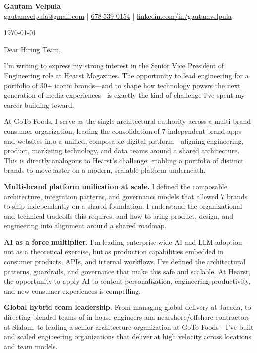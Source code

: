 \documentclass[11pt]{article}
\begin{document}
\begin{center}
    {\LARGE \textbf{Gautam Velpula}} \\[6pt]
    \href{mailto:gautamvelpula@gmail.com}{gautamvelpula@gmail.com} \;|\;
    \href{tel:6785390154}{678-539-0154} \;|\;
    \href{https://www.linkedin.com/in/gautamvelpula}{linkedin.com/in/gautamvelpula}
\end{center}

\vspace{14pt}

\today

\vspace{8pt}

Dear Hiring Team,

I'm writing to express my strong interest in the Senior Vice President of Engineering role at Hearst Magazines. The opportunity to lead engineering for a portfolio of 30+ iconic brands---and to shape how technology powers the next generation of media experiences---is exactly the kind of challenge I've spent my career building toward.

At GoTo Foods, I serve as the single architectural authority across a multi-brand consumer organization, leading the consolidation of 7 independent brand apps and websites into a unified, composable digital platform---aligning engineering, product, marketing technology, and data teams around a shared architecture. This is directly analogous to Hearst's challenge: enabling a portfolio of distinct brands to move faster on a modern, scalable platform underneath.

\textbf{Multi-brand platform unification at scale.} I defined the composable architecture, integration patterns, and governance models that allowed 7 brands to ship independently on a shared foundation. I understand the organizational and technical tradeoffs this requires, and how to bring product, design, and engineering into alignment around a shared roadmap.

\textbf{AI as a force multiplier.} I'm leading enterprise-wide AI and LLM adoption---not as a theoretical exercise, but as production capabilities embedded in consumer products, APIs, and internal workflows. I've defined the architectural patterns, guardrails, and governance that make this safe and scalable. At Hearst, the opportunity to apply AI to content personalization, engineering productivity, and new consumer experiences is compelling.

\textbf{Global hybrid team leadership.} From managing global delivery at Jacada, to directing blended teams of in-house engineers and nearshore/offshore contractors at Slalom, to leading a senior architecture organization at GoTo Foods---I've built and scaled engineering organizations that deliver at high velocity across locations and team models.
\end{document}

